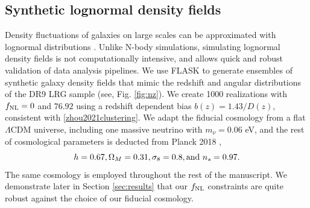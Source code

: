 \subsection{Synthetic lognormal density fields}\label{ssec:mocks}
Density fluctuations of galaxies on large scales can be approximated with lognormal distributions \citep{coles1991}. Unlike N-body simulations, simulating lognormal density fields is not computationally intensive, and allows quick and robust validation of data analysis pipelines. We use \textsc{FLASK} \citep[Full-sky Lognormal Astro-fields Simulation Kit;][]{Xavier_2016} to generate ensembles of synthetic galaxy density fields that mimic the redshift and angular distributions of the DR9 LRG sample (see, Fig. \ref{fig:nz}). We create 1000 realizations with $f_{\rm NL}=0$ and $76.92$ using a redshift dependent bias $b(z)=1.43/D(z)$, consistent with \ref{zhou2021clustering}. We adapt the fiducial cosmology from a flat $\Lambda$CDM universe, including one massive neutrino with $m_{\nu}=0.06$ eV, and the rest of cosmological parameters is deducted from Planck 2018 \citep{aghanim2020planck},
\begin{equation*}
 h = 0.67, \Omega_{M}=0.31, \sigma_{8}=0.8, {\rm and}~ n_{s}=0.97.
\end{equation*}
The same cosmology is employed throughout the rest of the manuscript. We demonstrate later in Section \ref{sec:results} that our $f_{\rm NL}$ constraints are quite robust against the choice of our fiducial cosmology.